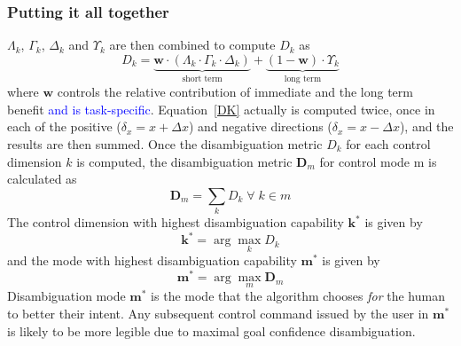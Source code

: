 \documentclass[conference]{IEEEtran}
\newcommand{\argmax}{\arg\!\max}
\begin{document}
\subsubsection*{Putting it all together}
$\Lambda_{k}$, $\Gamma_{k}$, $\Delta_{k}$ and $\Upsilon_{k}$ are then combined to compute $D_{k}$ as 
\begin{equation}\label{DK}
D_{k} = \underbrace{\boldsymbol{w}\cdot(\Lambda_{k}\cdot \Gamma_{k}\cdot \Delta_{k})}_{\text{short term}} + \underbrace{(1 - \boldsymbol{w})\cdot \Upsilon_{k}}_{\text{long term}}
\end{equation}
where $\boldsymbol{w}$ controls the relative contribution of immediate and the long term benefit \textcolor{blue}{and is task-specific}. Equation~\ref{DK} actually is computed twice, once in each of the positive ($\delta_x = x + \Delta x$) and negative directions ($\delta_x = x - \Delta x$), and the results are then summed. 
Once the disambiguation metric $D_k$ for each control dimension $k$ is computed, the disambiguation metric $\boldsymbol{D}_m$ for control mode m is calculated as 
\begin{equation*}
\boldsymbol{D}_m = \sum_{k} D_{k} \; \forall \; k \in m
\end{equation*}
The control dimension with highest disambiguation capability $\boldsymbol{k}^*$ is given by
\begin{equation*}
\boldsymbol{k}^* = \argmax_k D_{k}
\end{equation*}
 and the mode with highest disambiguation capability $\boldsymbol{m}^{*}$ is given by
\begin{equation*}
\boldsymbol{m}^* = \argmax_m \boldsymbol{D}_m
\end{equation*}
Disambiguation mode $\boldsymbol{m}^{*}$ is the mode that the algorithm chooses \textit{for} the human to better their intent. Any subsequent control command issued by the user in $\boldsymbol{m}^*$ is likely to be more legible due to maximal goal confidence disambiguation.
\end{document}
